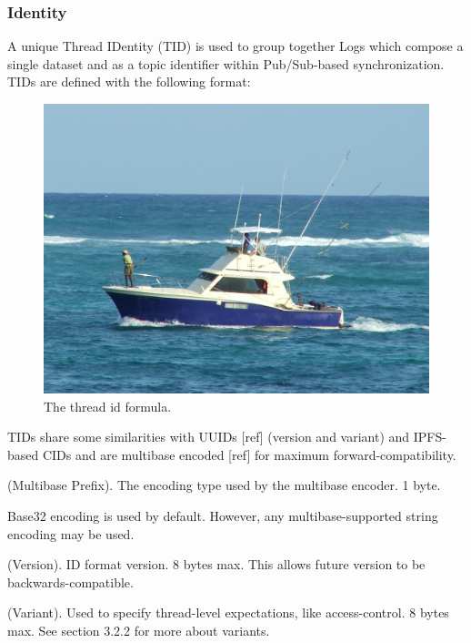 \documentclass{comjnl}
\begin{document}
\subsubsection{Identity}

A unique Thread IDentity (TID) is used to group together Logs which compose a single dataset and as a topic identifier within Pub/Sub-based synchronization. TIDs are defined with the following format:

\begin{figure}
  \includegraphics[width=\linewidth]{boat.jpg}
  \caption{The thread id formula.}
  \label{fig:boat1}
\end{figure}

TIDs share some similarities with UUIDs [ref] (version and variant) and IPFS-based CIDs and are multibase encoded [ref] for maximum forward-compatibility.

\begin{definition}
(Multibase Prefix). The encoding type used by the multibase encoder. 1 byte.
\end{definition}

Base32 encoding is used by default. However, any multibase-supported string encoding may be used.

\begin{definition}
(Version). ID format version. 8 bytes max. This allows future version to be backwards-compatible.
\end{definition}

\begin{definition}
(Variant). Used to specify thread-level expectations, like access-control. 8 bytes max. See section 3.2.2 for more about variants.
\end{definition}
\end{document}
